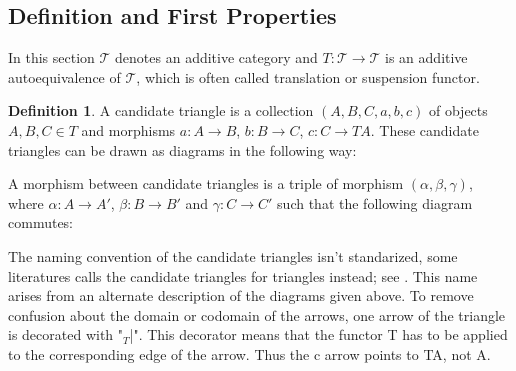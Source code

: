 \documentclass[12pt]{article}
\theoremstyle{definition}
\newtheorem{definition}{Definition}[section]
\theoremstyle{remark}
\begin{document}
        \subsection{Definition and First Properties}
            In this section $\mathcal{T}$ denotes an additive category and $T:\mathcal{T}\rightarrow\mathcal{T}$ is an additive autoequivalence of $\mathcal{T}$, which is often called translation or suspension functor.
            \begin{definition}
                A candidate triangle is a collection $(A,B,C,a,b,c)$ of objects \\ $A,B,C\in T$ and morphisms $a:A\rightarrow B$, $b:B\rightarrow C$, $c:C\rightarrow TA$. These candidate triangles can be drawn as diagrams in the following way:

                \begin{center}
                \end{center}

                A morphism between candidate triangles is a triple of morphism $(\alpha, \beta, \gamma)$, where $\alpha : A \rightarrow A'$, $\beta : B \rightarrow B'$ and $\gamma : C \rightarrow C'$ such that the following diagram commutes:

            \begin{center}
            \end{center}

            \end{definition}

            The naming convention of the candidate triangles isn't standarized, some literatures calls the candidate triangles for triangles instead; see \cite{keller}. This name arises from an alternate description of the diagrams given above. To remove confusion about the domain or codomain of the arrows, one arrow of the triangle is decorated with "$_T$|". This decorator means that the functor T has to be applied to the corresponding edge of the arrow. Thus the c arrow points to TA, not A.
\end{document}
